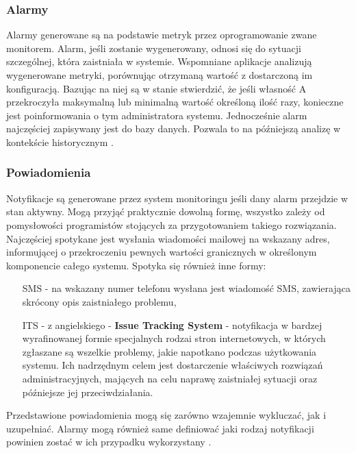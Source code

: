         \subsubsection{Alarmy}
        Alarmy generowane są na podstawie metryk przez oprogramowanie zwane monitorem. Alarm, jeśli zostanie wygenerowany, 
        odnosi się do sytuacji szczególnej, która zaistniała w systemie. Wspomniane aplikacje analizują wygenerowane metryki, 
        porównując otrzymaną wartość z dostarczoną im konfiguracją. Bazując na niej są w stanie stwierdzić, że jeśli
        własność A przekroczyła maksymalną lub minimalną wartość określoną ilość razy, konieczne jest poinformowania o tym
        administratora systemu. Jednocześnie alarm najczęściej zapisywany jest do bazy danych. Pozwala to na późniejszą analizę 
        w kontekście historycznym \cite{monitoring_and_alerting}. 
        
        \subsubsection{Powiadomienia}
        Notyfikacje są generowane przez system monitoringu jeśli dany alarm przejdzie w stan aktywny. Mogą przyjąć praktycznie
        dowolną formę, wszystko zależy od pomysłowości programistów stojących za przygotowaniem takiego rozwiązania.
        Najczęściej spotykane jest wysłania wiadomości mailowej na wskazany adres, informującej o 
        przekroczeniu pewnych wartości granicznych w określonym komponencie całego systemu. Spotyka się również inne formy:
        \begin{itemize}
            \item[SMS] - na wskazany numer telefonu wysłana jest wiadomość SMS, zawierająca skrócony opis zaistniałego problemu,
            \item[ITS] - z angielskiego - \textbf{Issue Tracking System} - notyfikacja w bardzej wyrafinowanej formie specjalnych rodzai stron internetowych, w których zgłaszane są wszelkie problemy, jakie napotkano
            podczas użytkowania systemu. Ich nadrzędnym celem jest dostarczenie właściwych rozwiązań administracyjnych, mających
            na celu naprawę zaistniałej sytuacji oraz późniejsze jej przeciwdziałania.
        \end{itemize}
        Przedstawione powiadomienia mogą się zarówno wzajemnie wykluczać, jak i uzupełniać. Alarmy mogą również same definiować jaki rodzaj notyfikacji
        powinien zostać w ich przypadku wykorzystany \cite{monitoring_and_alerting}.
        

